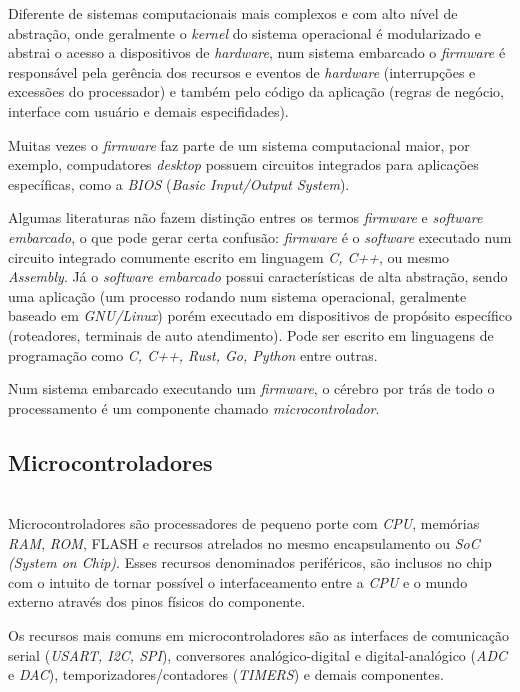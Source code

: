 \documentclass[times, twoside, watermark]{artigo}
\begin{document}
Diferente de sistemas computacionais mais complexos e com alto nível de abstração,
onde geralmente o \textit{kernel} do sistema operacional é modularizado e abstrai
o acesso a dispositivos de \textit{hardware},
num sistema embarcado o \textit{firmware} é responsável pela gerência dos recursos 
e eventos de \textit{hardware} (interrupções e excessões do processador) e também
pelo código da aplicação (regras de negócio, interface com usuário e demais especifidades).

Muitas vezes o \textit{firmware} faz parte de um sistema computacional maior,
por exemplo, compudatores \textit{desktop} possuem circuitos integrados para 
aplicações específicas, como a \textit{BIOS} (\textit{Basic Input/Output System}).

Algumas literaturas não fazem distinção entres os termos \textit{firmware} e 
\textit{software embarcado}, o que pode gerar certa confusão: \textit{firmware}
é o \textit{software} executado num circuito integrado comumente escrito em 
linguagem \textit{C, C++}, ou mesmo \textit{Assembly}. Já o \textit{software embarcado} 
possui características de alta abstração, sendo uma aplicação (um processo rodando 
num sistema operacional, geralmente baseado em \textit{GNU/Linux}) porém executado 
em dispositivos de propósito específico (roteadores, terminais de auto atendimento). 
Pode ser escrito em linguagens de programação como \textit{C, C++, Rust, Go, Python} entre outras.

Num sistema embarcado executando um \textit{firmware}, o cérebro por trás de todo o processamento é um componente chamado \textit{microcontrolador}.


\subsection{Microcontroladores}\hfill\\
Microcontroladores são processadores de pequeno porte com \textit{CPU}, memórias \textit{RAM}, \textit{ROM},
FLASH e recursos atrelados no mesmo encapsulamento ou \textit{SoC (System on Chip)}.
Esses recursos denominados periféricos, são inclusos no chip com o intuito de
tornar possível o interfaceamento entre a \textit{CPU} e o mundo externo através dos 
pinos físicos do componente.

Os recursos mais comuns em microcontroladores são as interfaces de comunicação 
serial (\textit{USART, I2C, SPI}), conversores analógico-digital e digital-analógico 
(\textit{ADC} e \textit{DAC}), temporizadores/contadores (\textit{TIMERS}) e demais componentes.
\end{document}
